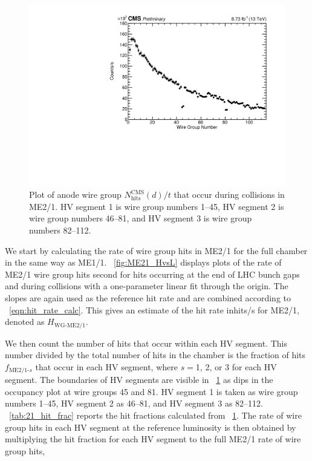 \begin{figure}
	\centering
	\includegraphics[width=\dummyFigWidth]{figures/neutron/occupancy_21_wire_total_CHAM_TIME_20180416.pdf}
  \caption[Plot of anode wire group ${N}^\text{CMS}_\text{hits}(d)/{t}$ that occur during \pp collisions in ME2/1.]{Plot of anode wire group ${N}^\text{CMS}_\text{hits}(d)/{t}$ that occur during \pp collisions in ME2/1. HV segment 1 is wire group numbers 1--45, HV segment 2 is wire group numbers 46--81, and HV segment 3 is wire group numbers 82--112.}
	\label{fig:ME21_inTrain_occ}
\end{figure}

We start by calculating the rate of wire group hits in ME2/1 for the full chamber in the same way as ME1/1. \Fig~\ref{fig:ME21_HvsL} displays plots of the rate of ME2/1 wire group hits second for hits occurring at the end of LHC bunch gaps and during \pp collisions with a one-parameter linear fit through the origin. The slopes are again used as the reference hit rate and are combined according to \Eq~\ref{eqn:hit_rate_calc}. This gives an estimate of the hit rate in\unit{hits/s} for ME2/1, denoted as $H_\text{WG-ME2/1}$.

We then count the number of hits that occur within each HV segment. This number divided by the total number of hits in the chamber is the fraction of hits $f_{\text{ME2/1-}s}$ that occur in each HV segment, where $s=$1, 2, or 3 for each HV segment. The boundaries of HV segments are visible in \FigDot~\ref{fig:ME21_inTrain_occ} as dips in the occupancy plot at wire groups 45 and 81. HV segment 1 is taken as wire group numbers 1--45, HV segment 2 as 46--81, and HV segment 3 as 82--112. \Tab~\ref{tab:21_hit_frac} reports the hit fractions calculated from \FigDot~\ref{fig:ME21_inTrain_occ}. The rate of wire group hits in each HV segment at the reference luminosity is then obtained by multiplying the hit fraction for each HV segment to the full ME2/1 rate of wire group hits, 

